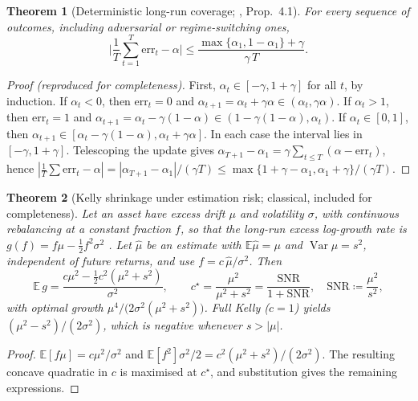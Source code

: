 \documentclass{article}
\theoremstyle{plain}
\newtheorem{theorem}{Theorem}
\theoremstyle{definition}
\theoremstyle{remark}
\newcommand{\E}{\mathbb{E}}
\DeclareMathOperator{\Var}{Var}
\begin{document}
\begin{theorem}[Deterministic long-run coverage; \citealp{gibbs2021}, Prop.~4.1]\label{thm:aci}
For \emph{every} sequence of outcomes, including adversarial or regime-switching ones,
\[
  \Big|\frac1T\sum_{t=1}^T\mathrm{err}_t-\alpha\Big|\le\frac{\max\{\alpha_1,1-\alpha_1\}+\gamma}{\gamma\,T}.
\]
\end{theorem}
\begin{proof}[Proof (reproduced for completeness)]
First, $\alpha_t\in[-\gamma,1+\gamma]$ for all $t$, by induction. If $\alpha_t<0$, then $\mathrm{err}_t=0$ and $\alpha_{t+1}=\alpha_t+\gamma\alpha\in(\alpha_t,\gamma\alpha)$. If $\alpha_t>1$, then $\mathrm{err}_t=1$ and $\alpha_{t+1}=\alpha_t-\gamma(1-\alpha)\in(1-\gamma(1-\alpha),\alpha_t)$. If $\alpha_t\in[0,1]$, then $\alpha_{t+1}\in[\alpha_t-\gamma(1-\alpha),\alpha_t+\gamma\alpha]$. In each case the interval lies in $[-\gamma,1+\gamma]$. Telescoping the update gives $\alpha_{T+1}-\alpha_1=\gamma\sum_{t\le T}(\alpha-\mathrm{err}_t)$, hence $|\frac1T\sum\mathrm{err}_t-\alpha|=|\alpha_{T+1}-\alpha_1|/(\gamma T)\le\max\{1+\gamma-\alpha_1,\alpha_1+\gamma\}/(\gamma T)$.
\end{proof}
\begin{theorem}[Kelly shrinkage under estimation risk; classical, included for completeness]\label{thm:kelly}
Let an asset have excess drift $\mu$ and volatility $\sigma$, with continuous rebalancing at a constant fraction $f$, so that the long-run excess log-growth rate is $g(f)=f\mu-\tfrac12f^2\sigma^2$ \citep{merton1969}. Let $\hat\mu$ be an estimate with $\E\hat\mu=\mu$ and $\Var\hat\mu=s^2$, independent of future returns, and use $f=c\,\hat\mu/\sigma^2$. Then
\[
  \E\,g=\frac{c\mu^2-\tfrac12c^2(\mu^2+s^2)}{\sigma^2},\qquad
  c^\star=\frac{\mu^2}{\mu^2+s^2}=\frac{\mathrm{SNR}}{1+\mathrm{SNR}},\quad\mathrm{SNR}\coloneqq\frac{\mu^2}{s^2},
\]
with optimal growth $\mu^4/\big(2\sigma^2(\mu^2+s^2)\big)$. Full Kelly ($c=1$) yields $(\mu^2-s^2)/(2\sigma^2)$, which is negative whenever $s>|\mu|$.
\end{theorem}
\begin{proof}
$\E[f\mu]=c\mu^2/\sigma^2$ and $\E[f^2]\sigma^2/2=c^2(\mu^2+s^2)/(2\sigma^2)$. The resulting concave quadratic in $c$ is maximised at $c^\star$, and substitution gives the remaining expressions.
\end{proof}
\end{document}
